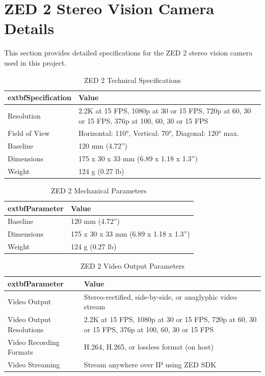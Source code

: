 \section{ZED 2 Stereo Vision Camera Details}\label{sec:zed2_details}
This section provides detailed specifications for the ZED 2 stereo vision camera used in this project.
\begin{table}[htbp]
	\centering
	\caption{ZED 2 Technical Specifications}
	\label{tab:zed2_specs}
	\begin{tabular}{|l|p{8cm}|}
		\hline
			extbf{Specification} & \textbf{Value} \\
		\hline
		Resolution & 2.2K at 15 FPS, 1080p at 30 or 15 FPS, 720p at 60, 30 or 15 FPS, 376p at 100, 60, 30 or 15 FPS \\
		\hline
		Field of View & Horizontal: 110°, Vertical: 70°, Diagonal: 120° max. \\
		\hline
		Baseline & 120 mm (4.72'') \\
		\hline
		Dimensions & 175 x 30 x 33 mm (6.89 x 1.18 x 1.3'') \\
		\hline
		Weight & 124 g (0.27 lb) \\
		\hline
	\end{tabular}
\end{table}
\begin{table}[htbp]
	\centering
	\caption{ZED 2 Mechanical Parameters}
	\label{tab:zed2_mechanical}
	\begin{tabular}{|l|l|}
		\hline
			extbf{Parameter} & \textbf{Value} \\
		\hline
		Baseline & 120 mm (4.72'') \\
		\hline
		Dimensions & 175 x 30 x 33 mm (6.89 x 1.18 x 1.3'') \\
		\hline
		Weight & 124 g (0.27 lb) \\
		\hline
	\end{tabular}
\end{table}
\begin{table}[htbp]
	\centering
	\caption{ZED 2 Video Output Parameters}
	\label{tab:zed2_video_output}
	\begin{tabular}{|l|p{8cm}|}
		\hline
			extbf{Parameter} & \textbf{Value} \\
		\hline
		Video Output & Stereo-rectified, side-by-side, or anaglyphic video stream \\
		\hline
		Video Output Resolutions & 2.2K at 15 FPS, 1080p at 30 or 15 FPS, 720p at 60, 30 or 15 FPS, 376p at 100, 60, 30 or 15 FPS \\
		\hline
		Video Recording Formats & H.264, H.265, or lossless format (on host) \\
		\hline
		Video Streaming & Stream anywhere over IP using ZED SDK \\
		\hline
	\end{tabular}
\end{table}
